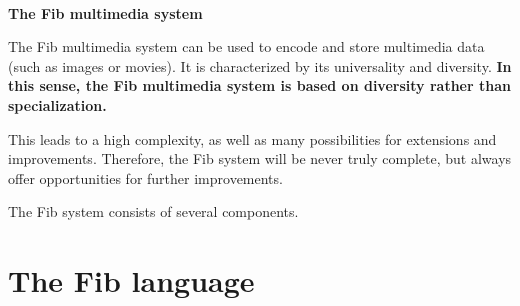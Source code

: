 \documentclass[12pt,a4paper]{article}
\begin{document}







\ \vspace{-2.5cm}
\begin{center}
	\LARGE\bf The Fib multimedia system\\
\end{center}

\bigskip\noindent
The Fib multimedia system can be used to encode and store multimedia data (such as images or movies).
It is characterized by its universality and diversity.
\textbf{In this sense, the Fib multimedia system is based on diversity rather than specialization.}

This leads to a high complexity, as well as many possibilities for extensions and improvements. Therefore, the Fib system will be never truly complete, but always offer opportunities for further improvements.



The Fib system consists of several components. %


\section{The Fib language}
\end{document}
